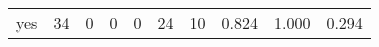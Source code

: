 \begin{longtable}{lp{2.0cm}p{2.0cm}p{2.0cm}p{2.0cm}p{2.0cm}p{2.0cm}p{2.0cm}p{2.0cm}p{2.0cm}}
yes       &                     34 &                                             0 &                                            0 &                                           0 &                                           24 &                                         10 &                                0.824 &                                  1.000 &                                0.294 \\
\end{longtable}

